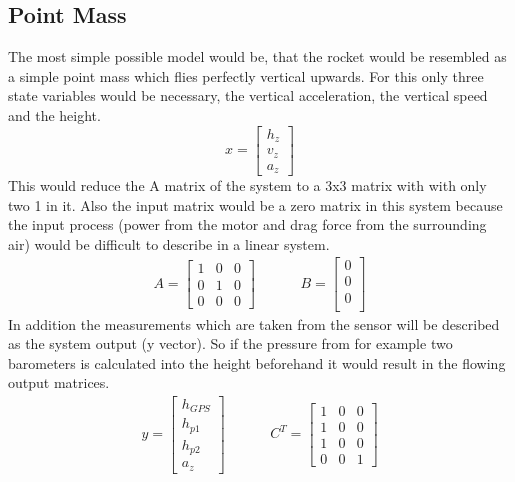   \subsection{Point Mass}
  The most simple possible model would be, that the rocket would be resembled as a simple point mass which flies perfectly vertical upwards.
  For this only three state variables would be necessary, the vertical acceleration, the vertical speed and the height.
  $$x = \begin{bmatrix}
  h_z\\
  v_z\\
  a_z
  \end{bmatrix} $$ 
  This would reduce the A matrix of the system to a 3x3 matrix with with only two 1 in it.
   Also the input matrix would be a zero matrix in this system because the input process 
  (power from the motor and drag force from the surrounding air) would be difficult to describe in a linear system.
  \begin{align*}
  A = \begin{bmatrix}
  1 & 0 & 0\\
  0 & 1 & 0\\
  0 & 0 & 0
  \end{bmatrix}
  & \hspace{1cm}
  B = \begin{bmatrix}
          0 \\
          0 \\
          0 \\
  \end{bmatrix}
  \end{align*}
  In addition the measurements which are taken from the sensor will be described as the system output (y vector). 
  So if the pressure from for example two barometers is calculated into the height beforehand it would result in the flowing output matrices.
 \begin{align*}
 y = \begin{bmatrix}
	  h_{GPS}	\\
          h_{p1}	\\
          h_{p2}	\\
          a_z
     \end{bmatrix}
    & \hspace{1cm}
 C^T = \begin{bmatrix}
         1 & 0 & 0	\\
	 1 & 0 & 0	\\
         1 & 0 & 0	\\
         0 & 0 & 1
        \end{bmatrix}     
  \end{align*}
  

